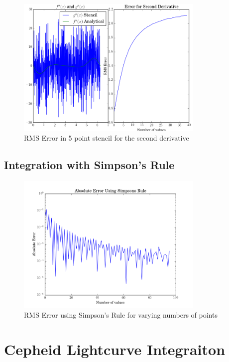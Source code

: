 \documentclass[12pt]{article}
\begin{document}
  \begin{figure}[h!]
    \centering
    \includegraphics[width=0.8\textwidth]{Problem2ib.png}
    \caption{RMS Error in 5 point stencil for the second derivative}
  \end{figure}

  \subsection{Integration with Simpson's Rule}
  
  \begin{figure}[h!]
    \centering
    \includegraphics[width=0.8\textwidth]{Problem2ii.png}
    \caption{RMS Error using Simpson's Rule for varying numbers of points}
  \end{figure}

  \clearpage

  \section{Cepheid Lightcurve Integraiton}
  
\end{document}
